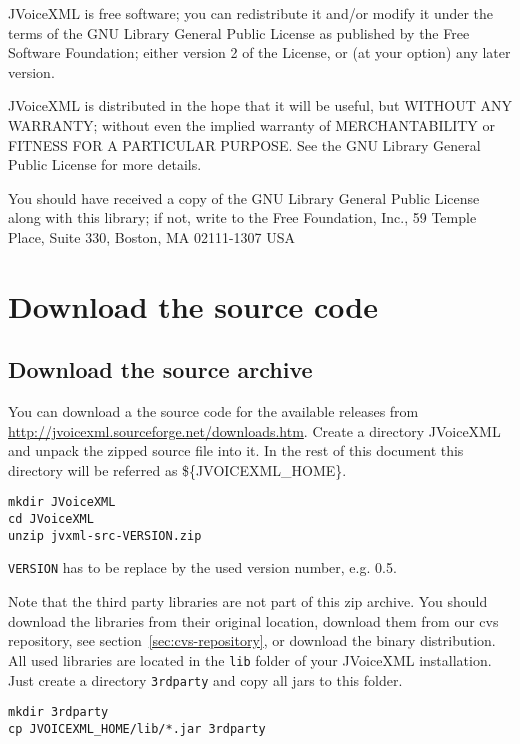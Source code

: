 \documentclass[11pt,a4paper]{article}
\begin{document}
JVoiceXML is free software; you can redistribute it and/or
modify it under the terms of the GNU Library General Public
License as published by the Free Software Foundation; either
version 2 of the License, or (at your option) any later version.

JVoiceXML is distributed in the hope that it will be useful,
but WITHOUT ANY WARRANTY; without even the implied warranty of
MERCHANTABILITY or FITNESS FOR A PARTICULAR PURPOSE. See the GNU
Library General Public License for more details.

You should have received a copy of the GNU Library General Public
License along with this library; if not, write to the Free
Foundation, Inc., 59 Temple Place, Suite 330, Boston, MA  02111-1307  USA

\section{Download the source code}

\subsection{Download the source archive}

You can download a the source code for the available releases from 
\url{http://jvoicexml.sourceforge.net/downloads.htm}.
Create a directory JVoice\-XML and unpack the zipped source file into it.
In the rest of this document this directory will be referred as
\$\{JVOICE\-XML\_HOME\}.

\begin{lstlisting}
mkdir JVoiceXML
cd JVoiceXML
unzip jvxml-src-VERSION.zip
\end{lstlisting}

\texttt{VERSION} has to be replace by the used version number, e.g. 0.5.

Note that the third party libraries are not part of this zip archive.
You should download the libraries from their original location,
download them from our cvs repository, see 
section~\ref{sec:cvs-repository}, or download the binary distribution.
All used libraries are located in the \texttt{lib} folder of
your JVoiceXML installation. Just create a directory 
\texttt{3rdparty} and copy all jars to this folder.

\begin{lstlisting}
mkdir 3rdparty
cp JVOICEXML_HOME/lib/*.jar 3rdparty
\end{lstlisting}
\end{document}
